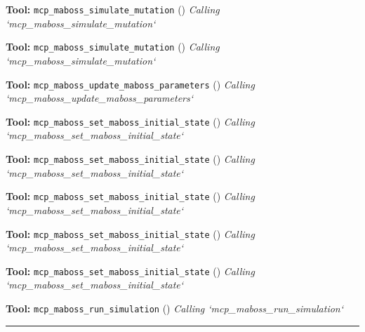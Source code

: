 \documentclass[11pt,a4paper]{article}
\begin{document}
\begin{toolokbox}
\textbf{Tool:} \texttt{mcp\_maboss\_simulate\_mutation} (\checkmark)
\textit{Calling `mcp\_maboss\_simulate\_mutation`}
\end{toolokbox}
\begin{toolokbox}
\textbf{Tool:} \texttt{mcp\_maboss\_simulate\_mutation} (\checkmark)
\textit{Calling `mcp\_maboss\_simulate\_mutation`}
\end{toolokbox}
\begin{toolokbox}
\textbf{Tool:} \texttt{mcp\_maboss\_update\_maboss\_parameters} (\checkmark)
\textit{Calling `mcp\_maboss\_update\_maboss\_parameters`}
\end{toolokbox}
\begin{toolokbox}
\textbf{Tool:} \texttt{mcp\_maboss\_set\_maboss\_initial\_state} (\checkmark)
\textit{Calling `mcp\_maboss\_set\_maboss\_initial\_state`}
\end{toolokbox}
\begin{toolokbox}
\textbf{Tool:} \texttt{mcp\_maboss\_set\_maboss\_initial\_state} (\checkmark)
\textit{Calling `mcp\_maboss\_set\_maboss\_initial\_state`}
\end{toolokbox}
\begin{toolokbox}
\textbf{Tool:} \texttt{mcp\_maboss\_set\_maboss\_initial\_state} (\checkmark)
\textit{Calling `mcp\_maboss\_set\_maboss\_initial\_state`}
\end{toolokbox}
\begin{toolokbox}
\textbf{Tool:} \texttt{mcp\_maboss\_set\_maboss\_initial\_state} (\checkmark)
\textit{Calling `mcp\_maboss\_set\_maboss\_initial\_state`}
\end{toolokbox}
\begin{toolokbox}
\textbf{Tool:} \texttt{mcp\_maboss\_set\_maboss\_initial\_state} (\checkmark)
\textit{Calling `mcp\_maboss\_set\_maboss\_initial\_state`}
\end{toolokbox}
\begin{toolokbox}
\textbf{Tool:} \texttt{mcp\_maboss\_run\_simulation} (\checkmark)
\textit{Calling `mcp\_maboss\_run\_simulation`}
\end{toolokbox}
\bigskip\hrule\bigskip
\end{document}
